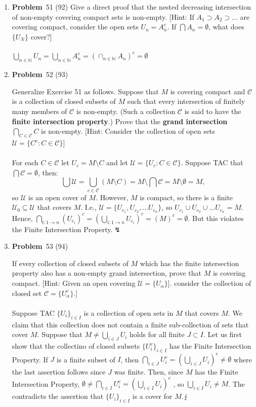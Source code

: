 \documentclass[12pt]{amsart}
\theoremstyle{definition}
\newcommand{\mbN}{\mathbb{N}}
\newcommand{\mcU}{\mathcal{U}}
\newcommand{\mcC}{\mathcal{C}}
\newcommand{\mc}[1]{\mathcal{#1}}
\newcommand{\itep}{\item {\bfseries Problem}\ }
\begin{document}
\begin{enumerate}[series=p]
\itep 51 (92)
Give a direct proof that the nested decreasing intersection of non-empty covering compact sets is non-empty.  [Hint: If $A_1 \supset A_2 \supset \dots$ are covering compact, consider the open sets $U_n = A^c_n$.  If $\bigcap A_n = \emptyset$, what does $\{U_N \}$ cover?] \\
\\
$\bigcup_{n \in \mbN} U_n = \bigcup_{n \in \mbN} A_n^c = (\cap_{n \in \mbN} A_n)^c = \emptyset$
\newpage

\itep 52 (93)

Generalize Exercise 51 as follows.  Suppose that $M$ is covering compact and $\mathcal{C}$ is a collection of closed subsets of $M$ such that every intersection of finitely many members of $\mathcal{C}$ is non-empty.  (Such a collection $\mathcal{C}$ is said to have the \textbf{finite intersection property}.)  Prove that the \textbf{grand intersection} $\bigcap_{C \in \mathcal{C}}C$ is non-empty.  [Hint: Consider the collection of open sets $\mcU = \{C^c : C \in \mathcal{C}\}$]
\\
\\
For each $C \in \mcC$ let $U_c = M \setminus C$ and let $\mcU = \{U_c : C \in \mcC \}$.  Suppose TAC that $\bigcap \mcC = \emptyset$, then:
$$ \bigcup \mcU = \bigcup_{c \in \mcC} (M \setminus C) = M \setminus \bigcap \mcC = M \setminus \emptyset = M,$$
so $\mcU$ is an open cover of $M$.  However, $M$ is compact, so there is a finite $\mcU_0 \subseteq \mcU$ that covers $M$.  I.e., $\mcU = \{U_{c_1}, U_{c_2}, \dots U_{c_n} \}$, so $U_{c_1} \cup U_{c_2} \cup \dots U_{c_n} = M$.  Hence, $\bigcap_{i:1 \to n} (U_{c_i})^c = (\bigcup_{i:1 \to n}U_{c_i})^c = (M)^c = \emptyset$.  But this violates the Finite Intersection Property.$\lightning$

\newpage

\itep 53 (94)

If every collection of closed subsets of $M$ which has the finite intersection property also has a non-empty grand intersection, prove that $M$ is covering compact.  [Hint: Given an open covering $\mcU = \{U_\alpha\}]$. consider the collection of closed set $\mc{C} = \{U_\alpha^c\}$.]
\\\\
Suppose TAC $\{U_i\}_{i\in I}$ is a collection of open sets in $M$ that covers $M$.  We claim that this collection does not contain a finite sub-collection of sets that cover $M$.  Suppose that $M \neq \bigcup_{i \in J}U_i$ holds for all finite $J \subset I$.  Let us first show that the collectino of closed subsets $\{U_i^c\}_{i \in I}$ has the Finite Intersection Property.  If $J$ is a finite subset of $I$, then $\bigcap_{i \in J}U_i^c = (\bigcup_{i \in J}U_i)^c \neq \emptyset$ where the last assertion follows since $J$ was finite.  Then, since $M$ has the Finite Intersection Property, $\emptyset \neq \bigcap_{i \in I}U_i^c = (\bigcup_{i \in I}U_i)^c$ , so $\bigcup_{i \in I}U_i \neq M$.  The contradicts the assertion that $\{U_i\}_{i \in I}$ is a cover for $M$.$\hfill\lightning$



\end{enumerate}
\end{document}
